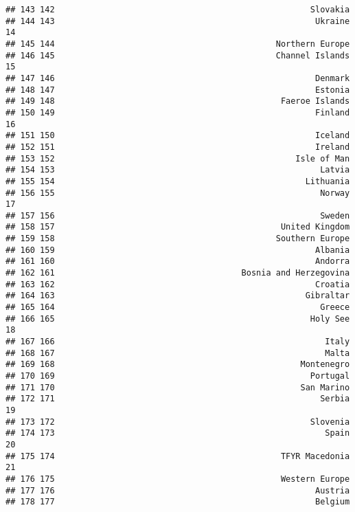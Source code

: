 \documentclass[]{article}
\begin{document}
\begin{verbatim}
## 143 142                                                    Slovakia   
## 144 143                                                     Ukraine 14
## 145 144                                             Northern Europe   
## 146 145                                             Channel Islands 15
## 147 146                                                     Denmark   
## 148 147                                                     Estonia   
## 149 148                                              Faeroe Islands   
## 150 149                                                     Finland 16
## 151 150                                                     Iceland   
## 152 151                                                     Ireland   
## 153 152                                                 Isle of Man   
## 154 153                                                      Latvia   
## 155 154                                                   Lithuania   
## 156 155                                                      Norway 17
## 157 156                                                      Sweden   
## 158 157                                              United Kingdom   
## 159 158                                             Southern Europe   
## 160 159                                                     Albania   
## 161 160                                                     Andorra   
## 162 161                                      Bosnia and Herzegovina   
## 163 162                                                     Croatia   
## 164 163                                                   Gibraltar   
## 165 164                                                      Greece   
## 166 165                                                    Holy See 18
## 167 166                                                       Italy   
## 168 167                                                       Malta   
## 169 168                                                  Montenegro   
## 170 169                                                    Portugal   
## 171 170                                                  San Marino   
## 172 171                                                      Serbia 19
## 173 172                                                    Slovenia   
## 174 173                                                       Spain 20
## 175 174                                              TFYR Macedonia 21
## 176 175                                              Western Europe   
## 177 176                                                     Austria   
## 178 177                                                     Belgium   

\end{verbatim}
\end{document}
